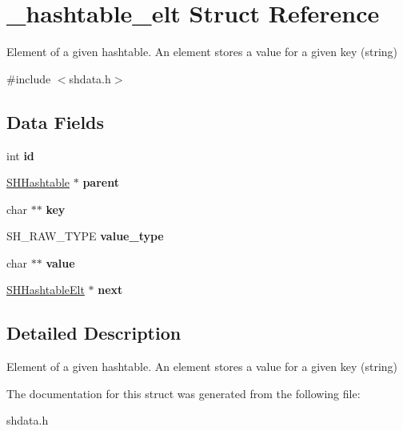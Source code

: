 \hypertarget{struct__hashtable__elt}{\section{\-\_\-hashtable\-\_\-elt Struct Reference}
\label{struct__hashtable__elt}
}


Element of a given hashtable. An element stores a value for a given key (string)  




{\ttfamily \#include $<$shdata.\-h$>$}

\subsection*{Data Fields}
\begin{DoxyCompactItemize}
\item 
\hypertarget{struct__hashtable__elt_a7441ef0865bcb3db9b8064dd7375c1ea}{int {\bfseries id}}\label{struct__hashtable__elt_a7441ef0865bcb3db9b8064dd7375c1ea}

\item 
\hypertarget{struct__hashtable__elt_a10c70d239a773dccc49a55b36b9c7d2f}{\hyperlink{struct__hashtable}{S\-H\-Hashtable} $\ast$ {\bfseries parent}}\label{struct__hashtable__elt_a10c70d239a773dccc49a55b36b9c7d2f}

\item 
\hypertarget{struct__hashtable__elt_aa94bfa291123e0b5a87aa7c325cb0f25}{char $\ast$$\ast$ {\bfseries key}}\label{struct__hashtable__elt_aa94bfa291123e0b5a87aa7c325cb0f25}

\item 
\hypertarget{struct__hashtable__elt_a5a64a1db24d275221951115e3325a5ce}{S\-H\-\_\-\-R\-A\-W\-\_\-\-T\-Y\-P\-E {\bfseries value\-\_\-type}}\label{struct__hashtable__elt_a5a64a1db24d275221951115e3325a5ce}

\item 
\hypertarget{struct__hashtable__elt_a9aa7f435dd6cbc78b545bcfd4c0da731}{char $\ast$$\ast$ {\bfseries value}}\label{struct__hashtable__elt_a9aa7f435dd6cbc78b545bcfd4c0da731}

\item 
\hypertarget{struct__hashtable__elt_a9e2edf7a1f84b31aaa23e243c6d3a3b9}{\hyperlink{struct__hashtable__elt}{S\-H\-Hashtable\-Elt} $\ast$ {\bfseries next}}\label{struct__hashtable__elt_a9e2edf7a1f84b31aaa23e243c6d3a3b9}

\end{DoxyCompactItemize}


\subsection{Detailed Description}
Element of a given hashtable. An element stores a value for a given key (string) 

The documentation for this struct was generated from the following file\-:\begin{DoxyCompactItemize}
\item 
shdata.\-h\end{DoxyCompactItemize}
